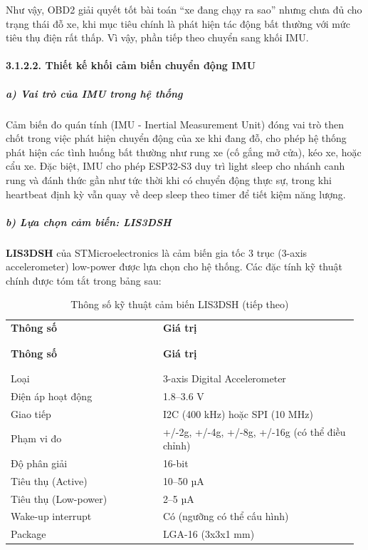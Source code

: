 \documentclass[a4paper]{extarticle}
\newcommand{\thesissettableid}[2]{%
  \renewcommand{\thetable}{#1}%
  \renewcommand{\theHtable}{#2}%
}
\begin{document}
Như vậy, OBD2 giải quyết tốt bài toán ``xe đang chạy ra sao'' nhưng
chưa đủ cho trạng thái đỗ xe, khi mục tiêu chính là phát hiện tác động
bất thường với mức tiêu thụ điện rất thấp. Vì vậy, phần tiếp theo chuyển
sang khối IMU.

\paragraph{3.1.2.2. Thiết kế khối cảm biến chuyển động
IMU}\label{3212-thiux1ebft-kux1ebf-muxf4-ux111un-cux1ea3m-biux1ebfn-chuyux1ec3n-ux111ux1ed9ng-imu}

\subparagraph{a) Vai trò của IMU trong hệ
thống}\label{a-vai-truxf2-cux1ee7a-imu-trong-hux1ec7-thux1ed1ng}

Cảm biến đo quán tính (IMU - Inertial Measurement Unit) đóng vai trò
then chốt trong việc phát hiện chuyển động của xe khi đang đỗ, cho phép
hệ thống phát hiện các tình huống bất thường như rung xe (cố gắng mở
cửa), kéo xe, hoặc cẩu xe. Đặc biệt, IMU cho phép ESP32-S3 duy trì
light sleep cho nhánh canh rung và đánh thức gần như tức thời khi có chuyển động thực sự,
trong khi heartbeat định kỳ vẫn quay về deep sleep theo timer để tiết kiệm năng lượng.

\subparagraph{b) Lựa chọn cảm biến:
LIS3DSH}\label{b-lux1ef1a-chux1ecdn-cux1ea3m-biux1ebfn-LIS3DH}

\textbf{LIS3DSH} của STMicroelectronics là cảm biến gia tốc 3 trục
(3-axis accelerometer) low-power được lựa chọn cho hệ thống. Các đặc
tính kỹ thuật chính được tóm tắt trong bảng sau:


{\thesissettableid{3.7}{tab-ch3-thong-so-ky-thuat-cam-bien-LIS3DH}
\def\LTcaptype{table}
\begin{longtable}{|L{0.426\linewidth}|L{0.542\linewidth}|}
\caption{Thông số kỹ thuật cảm biến LIS3DSH}\label{tab:ch3-thong-so-ky-thuat-cam-bien-LIS3DH}\\
\hline \textbf{Thông số} & \textbf{Giá trị} \\
\\\hline
\endfirsthead
\caption[]{Thông số kỹ thuật cảm biến LIS3DSH (tiếp theo)}\\
\hline \textbf{Thông số} & \textbf{Giá trị} \\
\\\hline
\endhead
\\\hline
\endfoot
\endlastfoot
Loại & 3-axis Digital Accelerometer \\\hline
Điện áp hoạt động & 1.8--3.6 V \\\hline
Giao tiếp & I2C (400 kHz) hoặc SPI (10 MHz) \\\hline
Phạm vi đo & +/-2g, +/-4g, +/-8g, +/-16g (có thể điều chỉnh) \\\hline
Độ phân giải & 16-bit \\\hline
Tiêu thụ (Active) & 10--50 µA \\\hline
Tiêu thụ (Low-power) & 2--5 µA \\\hline
Wake-up interrupt & Có (ngưỡng có thể cấu hình) \\\hline
Package & LGA-16 (3x3x1 mm) \\\hline
\end{longtable}
}
\end{document}
